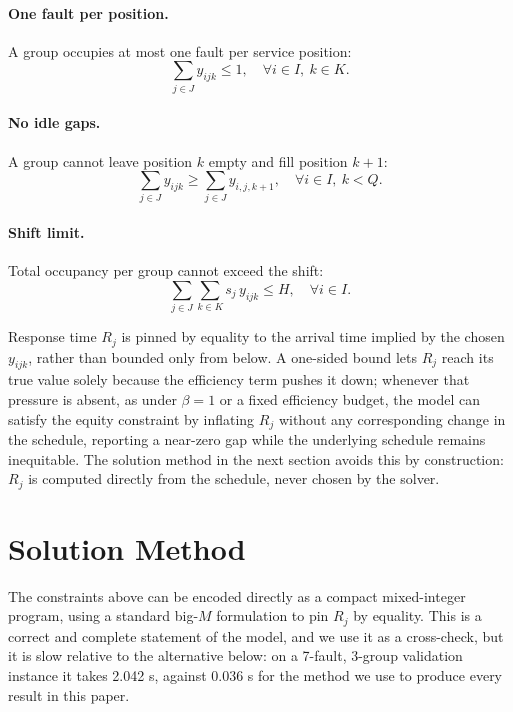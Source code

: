 \documentclass[11pt]{article}
\begin{document}
\paragraph{One fault per position.} A group occupies at most one fault per service position:
\begin{equation}
\sum_{j \in J} y_{ijk} \leq 1, \quad \forall i \in I,\ k \in K.
\end{equation}

\paragraph{No idle gaps.} A group cannot leave position $k$ empty and fill position $k+1$:
\begin{equation}
\sum_{j \in J} y_{ijk} \geq \sum_{j \in J} y_{i,j,k+1}, \quad \forall i \in I,\ k < Q.
\end{equation}

\paragraph{Shift limit.} Total occupancy per group cannot exceed the shift:
\begin{equation}
\sum_{j \in J}\sum_{k \in K} s_j\, y_{ijk} \leq H, \quad \forall i \in I.
\end{equation}

Response time $R_j$ is pinned by equality to the arrival time implied by the chosen $y_{ijk}$, rather than bounded only from below. A one-sided bound lets $R_j$ reach its true value solely because the efficiency term pushes it down; whenever that pressure is absent, as under $\beta=1$ or a fixed efficiency budget, the model can satisfy the equity constraint by inflating $R_j$ without any corresponding change in the schedule, reporting a near-zero gap while the underlying schedule remains inequitable. The solution method in the next section avoids this by construction: $R_j$ is computed directly from the schedule, never chosen by the solver.

\section*{Solution Method}

The constraints above can be encoded directly as a compact mixed-integer program, using a standard big-$M$ formulation to pin $R_j$ by equality. This is a correct and complete statement of the model, and we use it as a cross-check, but it is slow relative to the alternative below: on a 7-fault, 3-group validation instance it takes 2.042 s, against 0.036 s for the method we use to produce every result in this paper.
\end{document}
